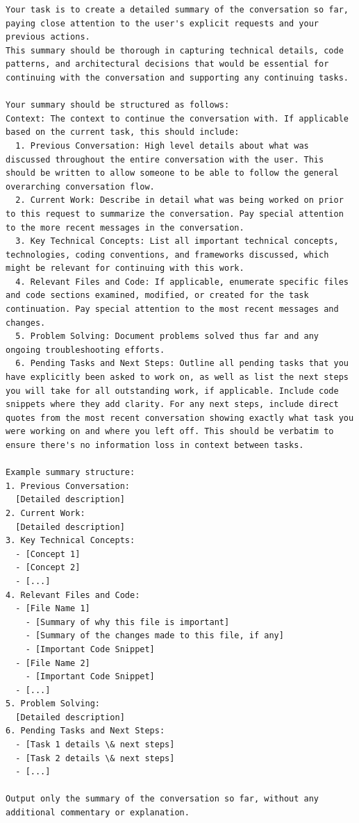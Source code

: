 \label{lst:summary-prompt}
\begin{lstlisting}[basicstyle=\footnotesize\ttfamily,breaklines=true,columns=fullflexible]
Your task is to create a detailed summary of the conversation so far, paying close attention to the user's explicit requests and your previous actions.
This summary should be thorough in capturing technical details, code patterns, and architectural decisions that would be essential for continuing with the conversation and supporting any continuing tasks.

Your summary should be structured as follows:
Context: The context to continue the conversation with. If applicable based on the current task, this should include:
  1. Previous Conversation: High level details about what was discussed throughout the entire conversation with the user. This should be written to allow someone to be able to follow the general overarching conversation flow.
  2. Current Work: Describe in detail what was being worked on prior to this request to summarize the conversation. Pay special attention to the more recent messages in the conversation.
  3. Key Technical Concepts: List all important technical concepts, technologies, coding conventions, and frameworks discussed, which might be relevant for continuing with this work.
  4. Relevant Files and Code: If applicable, enumerate specific files and code sections examined, modified, or created for the task continuation. Pay special attention to the most recent messages and changes.
  5. Problem Solving: Document problems solved thus far and any ongoing troubleshooting efforts.
  6. Pending Tasks and Next Steps: Outline all pending tasks that you have explicitly been asked to work on, as well as list the next steps you will take for all outstanding work, if applicable. Include code snippets where they add clarity. For any next steps, include direct quotes from the most recent conversation showing exactly what task you were working on and where you left off. This should be verbatim to ensure there's no information loss in context between tasks.

Example summary structure:
1. Previous Conversation:
  [Detailed description]
2. Current Work:
  [Detailed description]
3. Key Technical Concepts:
  - [Concept 1]
  - [Concept 2]
  - [...]
4. Relevant Files and Code:
  - [File Name 1]
    - [Summary of why this file is important]
    - [Summary of the changes made to this file, if any]
    - [Important Code Snippet]
  - [File Name 2]
    - [Important Code Snippet]
  - [...]
5. Problem Solving:
  [Detailed description]
6. Pending Tasks and Next Steps:
  - [Task 1 details \& next steps]
  - [Task 2 details \& next steps]
  - [...]

Output only the summary of the conversation so far, without any additional commentary or explanation.
\end{lstlisting}


